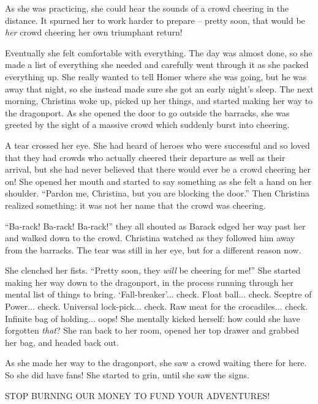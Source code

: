 \documentclass[showtrims,b6paper,draft,10pt]{memoir}
\begin{document}
As she was practicing, she could hear the sounds of a crowd cheering in the distance.  It spurned her to work harder to prepare -- pretty soon, that would be \emph{her} crowd cheering her own triumphant return!

Eventually she felt comfortable with everything.  The day was almost done, so she made a list of everything she needed and carefully went through it as she packed everything up.  She really wanted to tell Homer where she was going, but he was away that night, so she instead made sure she got an early night's sleep.
The next morning, Christina woke up, picked up her things, and started making her way to the dragonport.  As she opened the door to go outside the barracks, she was greeted by the sight of a massive crowd which suddenly burst into cheering.

A tear crossed her eye.  She had heard of heroes who were successful and so loved that they had crowds who actually cheered their departure as well as their arrival, but she had never believed that there would ever be a crowd cheering her on!  She opened her mouth and started to say something as she felt a hand on her shoulder.  ``Pardon me, Christina, but you are blocking the door.''  Then Christina realized something: it was not her name that the crowd was cheering.

``Ba-rack!  Ba-rack! Ba-rack!'' they all shouted as Barack edged her way past her and walked down to the crowd.  Christina watched as they followed him away from the barracks.  The tear was still in her eye, but for a different reason now.

She clenched her fists.  ``Pretty soon, they \emph{will} be cheering for me!''  She started making her way down to the dragonport, in the process running through her mental list of things to bring.  `Fall-breaker'... check.  Float ball... check.  Sceptre of Power... check.  Universal lock-pick... check.  Raw meat for the crocadiles... check.  Infinite bag of holding... oops!  She mentally kicked herself:  how could she have forgotten \emph{that}?  She ran back to her room, opened her top drawer and grabbed her bag, and headed back out.

As she made her way to the dragonport, she saw a crowd waiting there for here.  So she did have fans!  She started to grin, until she saw the signs.

STOP BURNING OUR MONEY TO FUND YOUR ADVENTURES!
\end{document}
